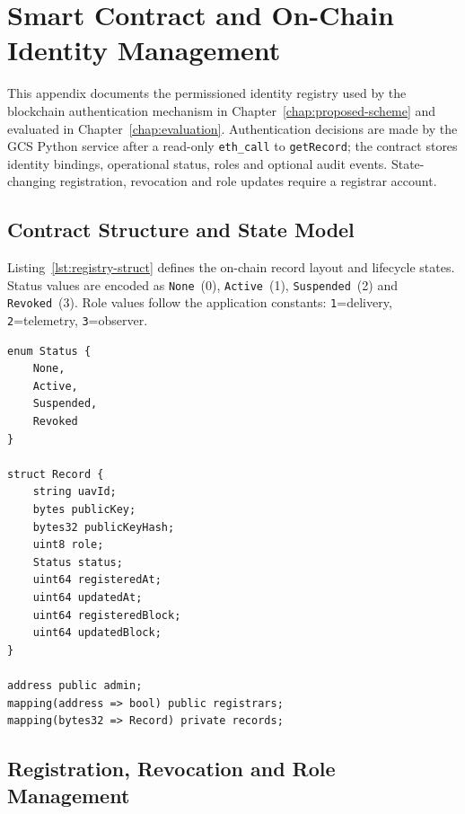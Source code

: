 
\chapter{Smart Contract and On-Chain Identity Management}
\label{app:smart-contract}

This appendix documents the permissioned identity registry used by the blockchain authentication mechanism in Chapter~\ref{chap:proposed-scheme} and evaluated in Chapter~\ref{chap:evaluation}. Authentication decisions are made by the GCS Python service after a read-only \texttt{eth\_call} to \texttt{getRecord}; the contract stores identity bindings, operational status, roles and optional audit events. State-changing registration, revocation and role updates require a registrar account.

\section{Contract Structure and State Model}
\label{app:contract-structure}

Listing~\ref{lst:registry-struct} defines the on-chain record layout and lifecycle states. Status values are encoded as \texttt{None}~(0), \texttt{Active}~(1), \texttt{Suspended}~(2) and \texttt{Revoked}~(3). Role values follow the application constants: \texttt{1}=delivery, \texttt{2}=telemetry, \texttt{3}=observer.

\begin{lstlisting}[style=solidity,caption={Identity record and status model (\texttt{UAVIdentityRegistry.sol}, lines 8--30)},label=lst:registry-struct]
enum Status {
    None,
    Active,
    Suspended,
    Revoked
}

struct Record {
    string uavId;
    bytes publicKey;
    bytes32 publicKeyHash;
    uint8 role;
    Status status;
    uint64 registeredAt;
    uint64 updatedAt;
    uint64 registeredBlock;
    uint64 updatedBlock;
}

address public admin;
mapping(address => bool) public registrars;
mapping(bytes32 => Record) private records;
\end{lstlisting}

\section{Registration, Revocation and Role Management}
\label{app:contract-lifecycle}

